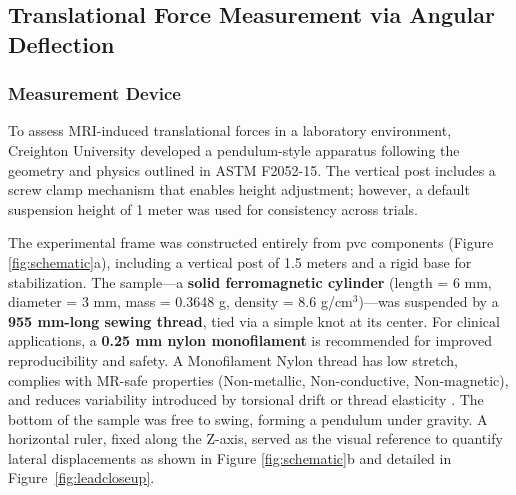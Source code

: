 \subsection{Translational Force Measurement via Angular Deflection}

\subsubsection{Measurement Device}

To assess MRI-induced translational forces in a laboratory environment, Creighton University developed a pendulum-style apparatus following the geometry and physics outlined in ASTM F2052-15\cite{astmF2052}. The vertical post includes a screw clamp mechanism that enables height adjustment; however, a default suspension height of 1 meter was used for consistency across trials.

The experimental frame was constructed entirely from \gls{pvc} components (Figure \ref{fig:schematic}a), including a vertical post of 1.5 meters and a rigid base for stabilization. The sample—a \textbf{solid ferromagnetic cylinder} (length = 6 mm, diameter = 3 mm, mass = 0.3648 g, density = 8.6 g/cm$^3$)—was suspended by a \textbf{955 mm-long sewing thread}, tied via a simple knot at its center. For clinical applications, a \textbf{0.25 mm nylon monofilament} is recommended for improved reproducibility and safety. A Monofilament Nylon thread has low stretch,  complies with MR-safe properties (Non-metallic, Non-conductive, Non-magnetic), and reduces variability introduced by torsional drift or thread elasticity  \cite{stoianovici2024, astmF2052}. The bottom of the sample was free to swing, forming a pendulum under gravity. A horizontal ruler, fixed along the Z-axis, served as the visual reference to quantify lateral displacements as shown in Figure \ref{fig:schematic}b and detailed in Figure~\ref{fig:leadcloseup}. 


